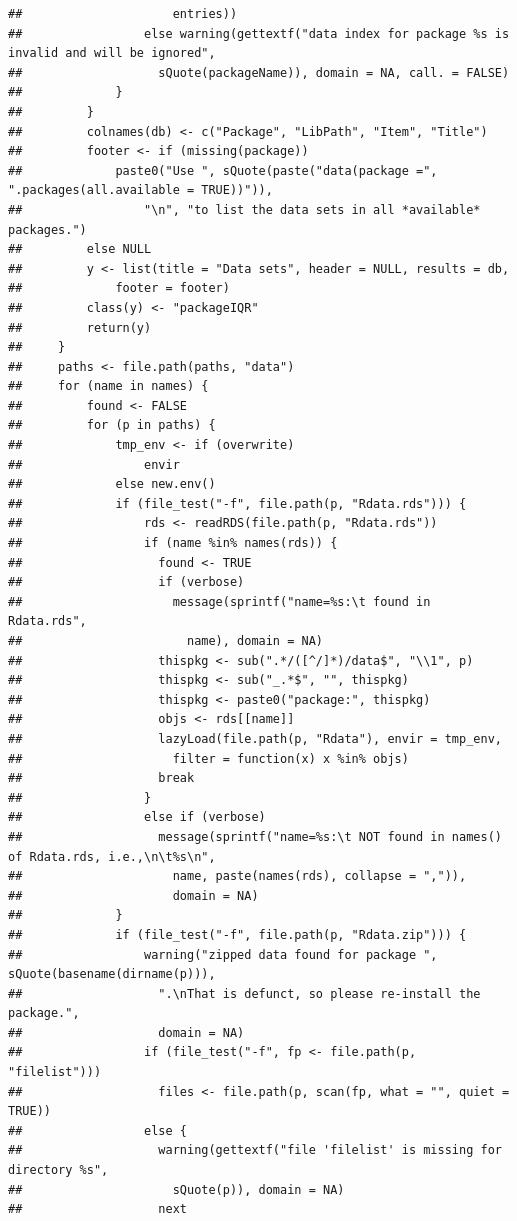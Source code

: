 \documentclass[
]{article}
\begin{document}
\begin{verbatim}
##                     entries))
##                 else warning(gettextf("data index for package %s is invalid and will be ignored", 
##                   sQuote(packageName)), domain = NA, call. = FALSE)
##             }
##         }
##         colnames(db) <- c("Package", "LibPath", "Item", "Title")
##         footer <- if (missing(package)) 
##             paste0("Use ", sQuote(paste("data(package =", ".packages(all.available = TRUE))")), 
##                 "\n", "to list the data sets in all *available* packages.")
##         else NULL
##         y <- list(title = "Data sets", header = NULL, results = db, 
##             footer = footer)
##         class(y) <- "packageIQR"
##         return(y)
##     }
##     paths <- file.path(paths, "data")
##     for (name in names) {
##         found <- FALSE
##         for (p in paths) {
##             tmp_env <- if (overwrite) 
##                 envir
##             else new.env()
##             if (file_test("-f", file.path(p, "Rdata.rds"))) {
##                 rds <- readRDS(file.path(p, "Rdata.rds"))
##                 if (name %in% names(rds)) {
##                   found <- TRUE
##                   if (verbose) 
##                     message(sprintf("name=%s:\t found in Rdata.rds", 
##                       name), domain = NA)
##                   thispkg <- sub(".*/([^/]*)/data$", "\\1", p)
##                   thispkg <- sub("_.*$", "", thispkg)
##                   thispkg <- paste0("package:", thispkg)
##                   objs <- rds[[name]]
##                   lazyLoad(file.path(p, "Rdata"), envir = tmp_env, 
##                     filter = function(x) x %in% objs)
##                   break
##                 }
##                 else if (verbose) 
##                   message(sprintf("name=%s:\t NOT found in names() of Rdata.rds, i.e.,\n\t%s\n", 
##                     name, paste(names(rds), collapse = ",")), 
##                     domain = NA)
##             }
##             if (file_test("-f", file.path(p, "Rdata.zip"))) {
##                 warning("zipped data found for package ", sQuote(basename(dirname(p))), 
##                   ".\nThat is defunct, so please re-install the package.", 
##                   domain = NA)
##                 if (file_test("-f", fp <- file.path(p, "filelist"))) 
##                   files <- file.path(p, scan(fp, what = "", quiet = TRUE))
##                 else {
##                   warning(gettextf("file 'filelist' is missing for directory %s", 
##                     sQuote(p)), domain = NA)
##                   next

\end{verbatim}
\end{document}
